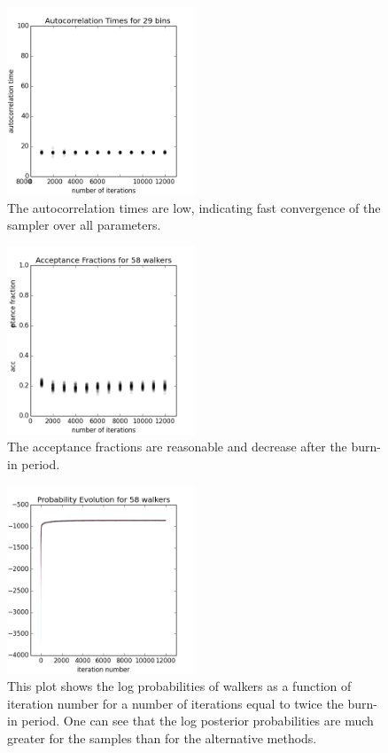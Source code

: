 \documentclass[preprint]{aastex}
\begin{document}
\begin{figure}
\includegraphics[width=0.5\textwidth]{times-real.png}
\caption{The autocorrelation times are low, indicating fast convergence of the sampler over all parameters.}
\label{fig:realacor}
\end{figure}

\begin{figure}
\includegraphics[width=0.5\textwidth]{fracs-real.png}
\caption{The acceptance fractions are reasonable and decrease after the burn-in period.}
\label{fig:realfrac}
\end{figure}

\begin{figure}
\includegraphics[width=0.5\textwidth]{probs-real.png}
\caption{This plot shows the log probabilities of walkers as a function of iteration number for a number of iterations equal to twice the burn-in period.  One can see that the log posterior probabilities are much greater for the samples than for the alternative methods.}
\label{fig:realprob}
\end{figure}
\end{document}

